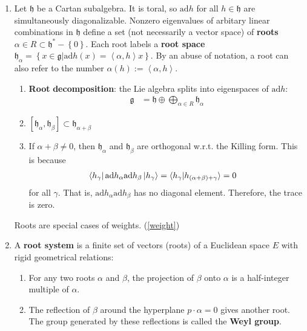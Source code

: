 \documentclass[aps,nofootinbib]{revtex4}
\begin{document}
\begin{enumerate}
\item \label{root decomposition} Let $\mathfrak{h}$ be a Cartan subalgebra. It is toral, so $\mbox{ad}h$
for all $h\in\mathfrak{h}$ are simultaneously diagonalizable. Nonzero
eigenvalues of arbitary linear combinations in $\mathfrak{h}$ define
a set (not necessarily a vector space) of \textbf{roots} $\alpha\in R\subset\mathfrak{h}^{*}-\left\{ 0\right\} $.
Each root labels a \textbf{root space} $\mathfrak{h}_{\alpha}=\left\{ x\in\mathfrak{g}|\mbox{ad}h\left(x\right)=\left\langle \alpha,h\right\rangle x\right\} $.
By an abuse of notation, a root can also refer to the number $\alpha\left(h\right):=\left\langle \alpha,h\right\rangle $.
\begin{enumerate}
\item \textbf{Root} \textbf{decomposition}:\textbf{ }the Lie algebra splits
into eigenspaces of $\mbox{ad}h$:
\begin{align*}
\mathfrak{g} & =\mathfrak{h}\oplus\bigoplus_{\alpha\in R}\mathfrak{h}_{\alpha}
\end{align*}

\item $\left[\mathfrak{h}_{\alpha},\mathfrak{h}_{\beta}\right]\subset\mathfrak{h}_{\alpha+\beta}$
\item If $\alpha+\beta\neq0$, then $\mathfrak{h}_{\alpha}$ and $\mathfrak{h}_{\beta}$
are orthogonal w.r.t. the Killing form. This is because
\begin{align*}
\bra{h_{\gamma}} \mbox{ad}h_{\alpha}\mbox{ad}h_{\beta} \ket{h_{\gamma}} & = \braket{h_{\gamma}|h_{\left(\alpha+\beta\right)+\gamma}}=0
\end{align*}
for all $\gamma$. That is, $\mbox{ad}h_{\alpha}\mbox{ad}h_{\beta}$
has no diagonal element. Therefore, the trace is zero.
\end{enumerate}
Roots are special cases of weights. (\ref{weight})

\item A \textbf{root system }is a finite set of vectors (roots) of a
Euclidean space $E$ with rigid geometrical relations:
\begin{enumerate}
\item For any two roots $\alpha$ and $\beta$, the projection of $\beta$
onto $\alpha$ is a half-integer multiple of $\alpha$.
\item The reflection of $\beta$ around the hyperplane $p\cdot\alpha=0$
gives another root. The group generated by these reflections is called
the \textbf{Weyl group}.
\end{enumerate}


\end{enumerate}
\end{document}
